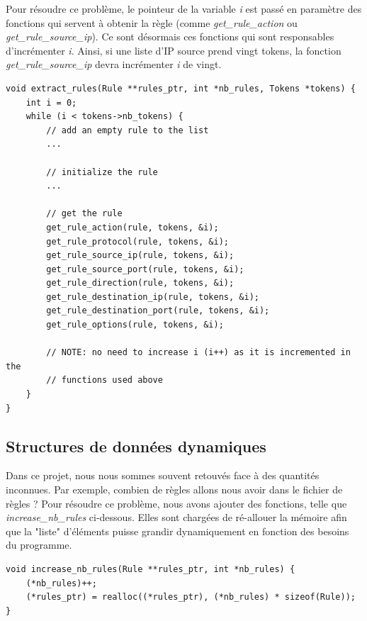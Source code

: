 \documentclass[a4paper]{article}
\begin{document}
Pour résoudre ce problème, le pointeur de la variable \textit{i} est passé en paramètre des fonctions qui servent à obtenir la règle (comme \textit{get\_rule\_action} ou \textit{get\_rule\_source\_ip}). Ce sont désormais ces fonctions qui sont responsables d'incrémenter \textit{i}. Ainsi, si une liste d'IP source prend vingt tokens, la fonction \textit{get\_rule\_source\_ip} devra incrémenter \textit{i} de vingt.
\begin{lstlisting}[style=CStyle]
void extract_rules(Rule **rules_ptr, int *nb_rules, Tokens *tokens) {
    int i = 0;
    while (i < tokens->nb_tokens) {
        // add an empty rule to the list
        ...

        // initialize the rule
        ...

        // get the rule
        get_rule_action(rule, tokens, &i);
        get_rule_protocol(rule, tokens, &i);
        get_rule_source_ip(rule, tokens, &i);
        get_rule_source_port(rule, tokens, &i);
        get_rule_direction(rule, tokens, &i);
        get_rule_destination_ip(rule, tokens, &i);
        get_rule_destination_port(rule, tokens, &i);
        get_rule_options(rule, tokens, &i);

        // NOTE: no need to increase i (i++) as it is incremented in the
        // functions used above
    }
}
\end{lstlisting}





\subsection{Structures de données dynamiques}



Dans ce projet, nous nous sommes souvent retouvés face à des quantités inconnues. Par exemple, combien de règles allons nous avoir dans le fichier de règles ? Pour résoudre ce problème, nous avons ajouter des fonctions, telle que \textit{increase\_nb\_rules} ci-dessous. Elles sont chargées de ré-allouer la mémoire afin que la "liste" d'éléments puisse grandir dynamiquement en fonction des besoins du programme.

\begin{lstlisting}[style=CStyle]
void increase_nb_rules(Rule **rules_ptr, int *nb_rules) {
    (*nb_rules)++;
    (*rules_ptr) = realloc((*rules_ptr), (*nb_rules) * sizeof(Rule));
}
\end{lstlisting}
\end{document}
